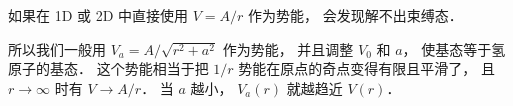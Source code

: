 
如果在 1D 或 2D 中直接使用 $V = A/r$ 作为势能， 会发现解不出束缚态．

所以我们一般用 $V_a = A/\sqrt{r^2 + a^2}$ 作为势能， 并且调整 $V_0$ 和 $a$， 使基态等于氢原子的基态． 这个势能相当于把 $1/r$ 势能在原点的奇点变得有限且平滑了， 且 $r\to\infty$ 时有 $V \to A/r$． 当 $a$ 越小， $V_a(r)$ 就越趋近 $V(r)$．

